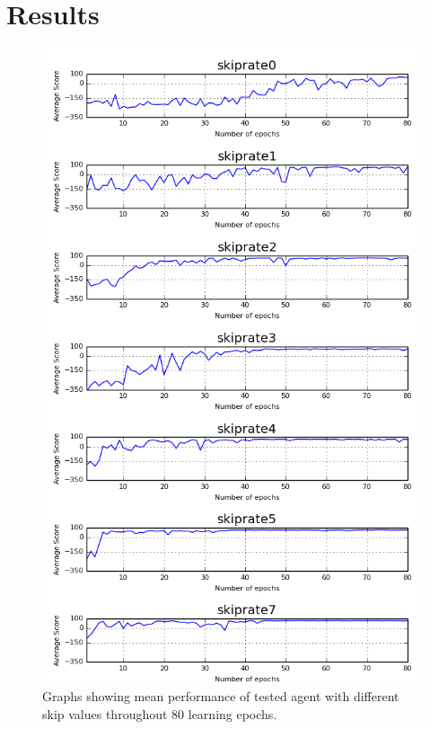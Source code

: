 \documentclass[english,bachelor,a4paper,twoside]{ppfcmthesis}
\begin{document}
\section{Results}
		\begin{figure}
			\centering
			\includegraphics{results.png}
			\caption{Graphs showing mean performance of tested agent with different skip values throughout 80 learning epochs.}\label{fig:results}
		\end{figure}
\end{document}
